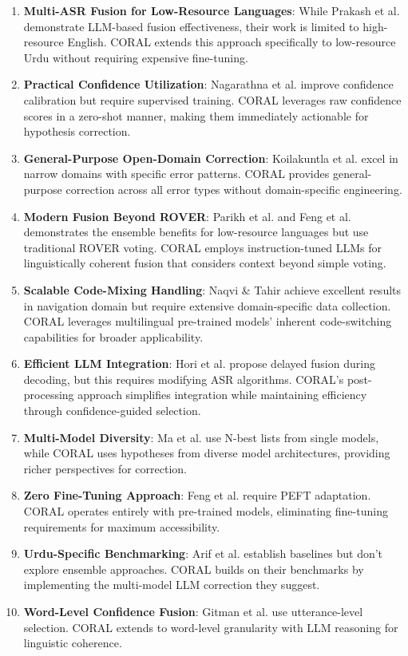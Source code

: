 \begin{enumerate}[topsep=6pt,itemsep=3pt]
    \item \textbf{Multi-ASR Fusion for Low-Resource Languages}: While Prakash et al. demonstrate LLM-based fusion effectiveness, their work is limited to high-resource English. CORAL extends this approach specifically to low-resource Urdu without requiring expensive fine-tuning.
    
    \item \textbf{Practical Confidence Utilization}: Nagarathna et al. improve confidence calibration but require supervised training. CORAL leverages raw confidence scores in a zero-shot manner, making them immediately actionable for hypothesis correction.
    
    \item \textbf{General-Purpose Open-Domain Correction}: Koilakuntla et al. excel in narrow domains with specific error patterns. CORAL provides general-purpose correction across all error types without domain-specific engineering.
    
    \item \textbf{Modern Fusion Beyond ROVER}: Parikh et al. and Feng et al. demonstrates the ensemble benefits for low-resource languages but use traditional ROVER voting. CORAL employs instruction-tuned LLMs for linguistically coherent fusion that considers context beyond simple voting.
    
    \item \textbf{Scalable Code-Mixing Handling}: Naqvi \& Tahir achieve excellent results in navigation domain but require extensive domain-specific data collection. CORAL leverages multilingual pre-trained models' inherent code-switching capabilities for broader applicability.
    
    \item \textbf{Efficient LLM Integration}: Hori et al. propose delayed fusion during decoding, but this requires modifying ASR algorithms. CORAL's post-processing approach simplifies integration while maintaining efficiency through confidence-guided selection.
    
    \item \textbf{Multi-Model Diversity}: Ma et al. use N-best lists from single models, while CORAL uses hypotheses from diverse model architectures, providing richer perspectives for correction.
    
    \item \textbf{Zero Fine-Tuning Approach}: Feng et al. require PEFT adaptation. CORAL operates entirely with pre-trained models, eliminating fine-tuning requirements for maximum accessibility.
    
    \item \textbf{Urdu-Specific Benchmarking}: Arif et al. establish baselines but don't explore ensemble approaches. CORAL builds on their benchmarks by implementing the multi-model LLM correction they suggest.
    
    \item \textbf{Word-Level Confidence Fusion}: Gitman et al. use utterance-level selection. CORAL extends to word-level granularity with LLM reasoning for linguistic coherence.
\end{enumerate}

